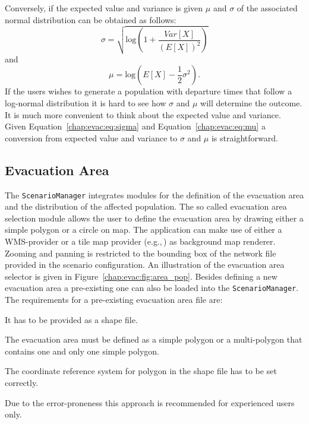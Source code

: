 Conversely, if the expected value and variance is given $\mu$ and $\sigma$ of the associated normal distribution can be obtained as follows:
\begin{equation}
\sigma = \sqrt{\text{log}(1+\frac{Var[X]}{(E[X])^2})}\label{chap:evac:eq:sigma}
\end{equation}
and 
\begin{equation}
\mu = \text{log}(E[X] - \frac{1}{2}\sigma^2).\label{chap:evac:eq:mu}
\end{equation}
If the users wishes to generate a population with departure times that follow a log-normal distribution it is hard to see how $\sigma$ and $\mu$ will determine the outcome. It is much more convenient to think about the expected value and variance. Given Equation~\ref{chap:evac:eq:sigma} and Equation~\ref{chap:evac:eq:mu} a conversion from expected value and variance to $\sigma$ and $\mu$ is straightforward.

\subsection{Evacuation Area}%
The \lstinline|ScenarioManager| integrates modules for the definition of the evacuation area and the distribution of the affected population. The so called evacuation area selection module allows the user to define the evacuation area by drawing either a simple polygon or a circle on map. The application can make use of either a WMS-provider or a tile map provider (e.g.,\,) as background map renderer. Zooming and panning is restricted to the bounding box of the  network file provided in the scenario configuration. An illustration of the evacuation area selector is given in Figure~\ref{chap:evac:fig:area_pop}. Besides defining a new evacuation area a pre-existing one can also be loaded into the \lstinline|ScenarioManager|. The requirements for a pre-existing evacuation area file are:
\begin{compactitem}
\item It has to be provided as a  shape file.
\item The evacuation area must be defined as a simple polygon or a multi-polygon that contains one and only one simple polygon.
\item The coordinate reference system for polygon in the  shape file has to be set correctly. 
\end{compactitem}
Due to the error-proneness this approach is recommended for experienced users only.

